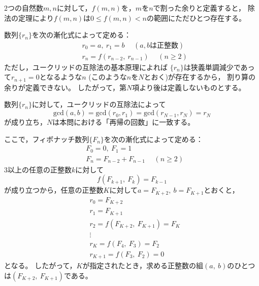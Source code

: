 \documentclass{article}
\begin{document}
2つの自然数$m, n$に対して，$f(m, n)$を，$m$を$n$で割った余りと定義すると，
除法の定理により$f(m, n)$は$0 \leq f(m, n) < n$の範囲にただひとつ存在する。

数列$\{r_n\}$を次の漸化式によって定める：
\begin{eqnarray*}
    &r_0 = a,\ r_1 = b \hspace{15pt} (\mbox{$a, b$は正整数}) \\
    &r_n = f(r_{n - 2},\ r_{n - 1}) \hspace{15pt} (n \geq 2)
\end{eqnarray*}
ただし，ユークリッドの互除法の基本原理によれば
$\{r_n\}$は狭義単調減少であって$r_{n + 1} = 0$となるような$n$ (このような$n$を$N$とおく)が存在するから，
割り算の余りが定義できない。
したがって，第$N$項より後は定義しないものとする。

数列$\{r_n\}$に対して，ユークリッドの互除法によって
\begin{equation*}
    \mathrm{gcd}(a, b)
    = \mathrm{gcd}(r_0, r_1)
    = \mathrm{gcd}(r_{N - 1}, r_{N})
    = r_{N}
\end{equation*}
が成り立ち，$N$は本問における「再帰の回数」に一致する。

ここで，フィボナッチ数列$\{F_n\}$を次の漸化式によって定める：
\begin{eqnarray*}
    &F_0 = 0,\ F_1 = 1 \\
    &F_n = F_{n - 2} + F_{n - 1} \hspace{15pt} (n \geq 2)
\end{eqnarray*}
3以上の任意の正整数$k$に対して
\begin{equation*}
    f(F_{k + 1},\ F_{k}) = F_{k - 1}
\end{equation*}
が成り立つから，任意の正整数$K$に対して$a = F_{K + 2},\ b = F_{K + 1}$とおくと，
\begin{eqnarray*}
    &r_0 = F_{K + 2} \\
    &r_1 = F_{K + 1} \\
    &r_2 = f(F_{K + 2},\ F_{K + 1}) = F_{K} \\
    &\vdots \\
    &r_K = f(F_{4},\ F_{3}) = F_2 \\
    &r_{K + 1} = f(F_{3},\ F_{2}) = 0
\end{eqnarray*}
となる。
したがって，$K$が指定されたとき，求める正整数の組$(a,\ b)$のひとつは$(F_{K + 2},\ F_{K + 1})$である。
\end{document}
